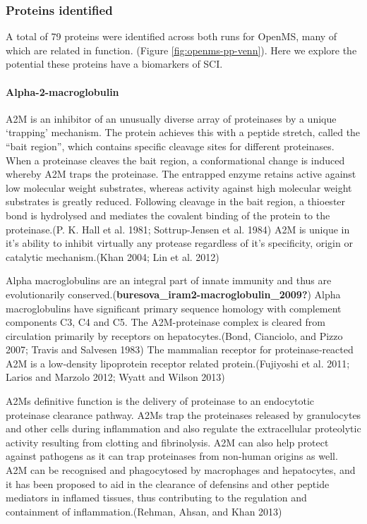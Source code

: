 \documentclass[9pt,lineno]{elife}
\begin{document}
\begin{landscape}
\begin{landscape}
\hypertarget{proteins-identified}{%
\subsubsection{Proteins identified}\label{proteins-identified}}

A total of 79 proteins were identified across both runs for OpenMS, many of which are related in function.
(Figure \ref{fig:openms-pp-venn}).
Here we explore the potential these proteins have a biomarkers of SCI.

\hypertarget{alpha-2-macroglobulin}{%
\paragraph{Alpha-2-macroglobulin}\label{alpha-2-macroglobulin}}

A2M is an inhibitor of an unusually diverse array of proteinases by a unique `trapping' mechanism.
The protein achieves this with a peptide stretch, called the ``bait region'', which contains specific cleavage sites for different proteinases.
When a proteinase cleaves the bait region, a conformational change is induced whereby A2M traps the proteinase.
The entrapped enzyme retains active against low molecular weight substrates, whereas activity against high molecular weight substrates is greatly reduced.
Following cleavage in the bait region, a thioester bond is hydrolysed and mediates the covalent binding of the protein to the proteinase.(P. K. Hall et al. 1981; Sottrup-Jensen et al. 1984) A2M is unique in it's ability to inhibit virtually any protease regardless of it's specificity, origin or catalytic mechanism.(Khan 2004; Lin et al. 2012)

Alpha macroglobulins are an integral part of innate immunity and thus are evolutionarily conserved.(\textbf{buresova\_iram2-macroglobulin\_2009?}) Alpha macroglobulins have significant primary sequence homology with complement components C3, C4 and C5. The A2M-proteinase complex is cleared from circulation primarily by receptors on hepatocytes.(Bond, Cianciolo, and Pizzo 2007; Travis and Salvesen 1983) The mammalian receptor for proteinase‐reacted A2M is a low‐density lipoprotein receptor related protein.(Fujiyoshi et al. 2011; Larios and Marzolo 2012; Wyatt and Wilson 2013)

A2Ms definitive function is the delivery of proteinase to an endocytotic proteinase clearance pathway.
A2Ms trap the proteinases released by granulocytes and other cells during inflammation and also regulate the extracellular proteolytic activity resulting from clotting and fibrinolysis.
A2M can also help protect against pathogens as it can trap proteinases from non-human origins as well.
A2M can be recognised and phagocytosed by macrophages and hepatocytes, and it has been proposed to aid in the clearance of defensins and other peptide mediators in inflamed tissues, thus contributing to the regulation and containment of inflammation.(Rehman, Ahsan, and Khan 2013)


\end{landscape}
\end{landscape}
\end{document}
